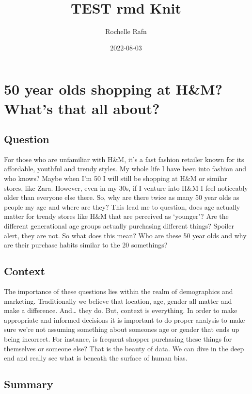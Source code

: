 \documentclass[
]{article}
\title{TEST rmd Knit}
\author{Rochelle Rafn}
\date{2022-08-03}
\begin{document}
\maketitle

\hypertarget{year-olds-shopping-at-hm-whats-that-all-about}{%
\section{50 year olds shopping at H\&M? What's that all
about?}\label{year-olds-shopping-at-hm-whats-that-all-about}}

\hypertarget{question}{%
\subsection{Question}\label{question}}

For those who are unfamiliar with H\&M, it's a fast fashion retailer
known for its affordable, youthful and trendy styles. My whole life I
have been into fashion and who knows? Maybe when I'm 50 I will still be
shopping at H\&M or similar stores, like Zara. However, even in my 30s,
if I venture into H\&M I feel noticeably older than everyone else there.
So, why are there twice as many 50 year olds as people my age and where
are they? This lead me to question, does age actually matter for trendy
stores like H\&M that are perceived as `younger'? Are the different
generational age groups actually purchasing different things? Spoiler
alert, they are not. So what does this mean? Who are these 50 year olds
and why are their purchase habits similar to the 20 somethings?

\hypertarget{context}{%
\subsection{Context}\label{context}}

The importance of these questions lies within the realm of demographics
and marketing. Traditionally we believe that location, age, gender all
matter and make a difference. And\ldots{} they do. But, context is
everything. In order to make appropriate and informed decisions it is
important to do proper analysis to make sure we're not assuming
something about someones age or gender that ends up being incorrect. For
instance, is frequent shopper purchasing these things for themselves or
someone else? That is the beauty of data. We can dive in the deep end
and really see what is beneath the surface of human bias.

\hypertarget{summary}{%
\subsection{Summary}\label{summary}}
\end{document}
